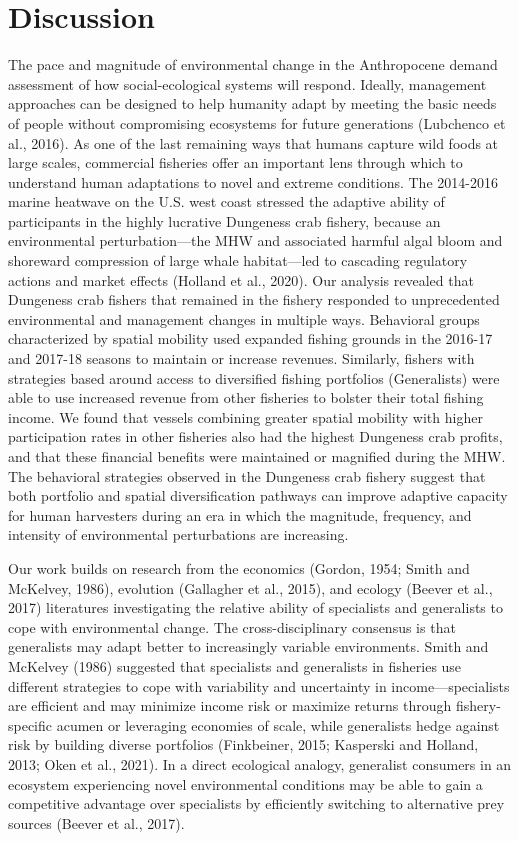 \documentclass[]{elsarticle} %
\begin{document}
\hypertarget{discussion}{%
\section{Discussion}\label{discussion}}

The pace and magnitude of environmental change in the Anthropocene
demand assessment of how social-ecological systems will respond.
Ideally, management approaches can be designed to help humanity adapt by
meeting the basic needs of people without compromising ecosystems for
future generations (Lubchenco et al., 2016). As one of the last
remaining ways that humans capture wild foods at large scales,
commercial fisheries offer an important lens through which to understand
human adaptations to novel and extreme conditions. The 2014-2016 marine
heatwave on the U.S. west coast stressed the adaptive ability of
participants in the highly lucrative Dungeness crab fishery, because an
environmental perturbation---the MHW and associated harmful algal bloom
and shoreward compression of large whale habitat---led to cascading
regulatory actions and market effects (Holland et al., 2020). Our
analysis revealed that Dungeness crab fishers that remained in the
fishery responded to unprecedented environmental and management changes
in multiple ways. Behavioral groups characterized by spatial mobility
used expanded fishing grounds in the 2016-17 and 2017-18 seasons to
maintain or increase revenues. Similarly, fishers with strategies based
around access to diversified fishing portfolios (Generalists) were able
to use increased revenue from other fisheries to bolster their total
fishing income. We found that vessels combining greater spatial mobility
with higher participation rates in other fisheries also had the highest
Dungeness crab profits, and that these financial benefits were
maintained or magnified during the MHW. The behavioral strategies
observed in the Dungeness crab fishery suggest that both portfolio and
spatial diversification pathways can improve adaptive capacity for human
harvesters during an era in which the magnitude, frequency, and
intensity of environmental perturbations are increasing.

Our work builds on research from the economics (Gordon, 1954; Smith and
McKelvey, 1986), evolution (Gallagher et al., 2015), and ecology (Beever
et al., 2017) literatures investigating the relative ability of
specialists and generalists to cope with environmental change. The
cross-disciplinary consensus is that generalists may adapt better to
increasingly variable environments. Smith and McKelvey (1986) suggested
that specialists and generalists in fisheries use different strategies
to cope with variability and uncertainty in income---specialists are
efficient and may minimize income risk or maximize returns through
fishery-specific acumen or leveraging economies of scale, while
generalists hedge against risk by building diverse portfolios
(Finkbeiner, 2015; Kasperski and Holland, 2013; Oken et al., 2021). In a
direct ecological analogy, generalist consumers in an ecosystem
experiencing novel environmental conditions may be able to gain a
competitive advantage over specialists by efficiently switching to
alternative prey sources (Beever et al., 2017).
\end{document}
